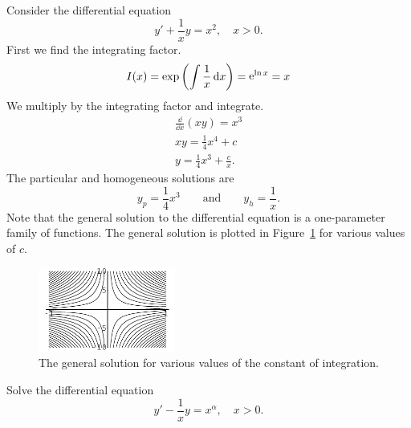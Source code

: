 \begin{Example}
  Consider the differential equation
  \[ 
  y' + \frac{1}{x} y = x^2, \quad x > 0. 
  \]
  First we find the integrating factor.
  \[ 
  I(x) = \exp \left( \int \frac{1}{x} \,\mathrm{d} x \right) = \mathop{\mathrm{e}}\nolimits^{\ln x} = x
  \]
  We multiply by the integrating factor and integrate.
  \begin{gather*}
    \frac{\dd}{\dd x} (x y) = x^3 
    \\
    x y = \frac{1}{4} x^4 + c 
    \\
    \boxed{ 
      y = \frac{1}{4} x^3 + \frac{c}{x}. 
      }
  \end{gather*}
  The particular and homogeneous solutions are
  \[ 
  y_p = \frac{1}{4} x^3 \qquad \mathrm{and} \qquad y_h = \frac{1}{x}. 
  \]
  Note that the general solution to the differential equation is a 
  one-parameter family of functions.  The general solution is plotted
  in Figure~\ref{figure one param} for various values of $c$.

  \begin{figure}[tb!]
    \begin{center}
      \includegraphics[width=0.4\textwidth]{ode/first_order/one_par}
    \end{center}
    \caption{The general solution for various values of the constant of
      integration.}
    \label{figure one param}
  \end{figure}

\end{Example}







\begin{Exercise}
  \label{exercise y - 1/x y = x alpha}
  Solve the differential equation
  \[
  y' - \frac{1}{x} y = x^\alpha, \quad x > 0.
  \]

\end{Exercise}







